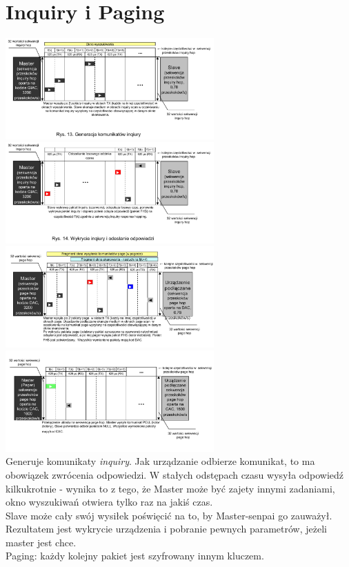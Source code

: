\section{Inquiry i Paging}
\includegraphics[width=8cm]{./wyklady/Rysunek06.pdf}
\includegraphics[width=8cm]{./wyklady/Rysunek07.pdf}\\
\includegraphics[width=8cm]{./wyklady/Rysunek08.pdf}
\includegraphics[width=8cm]{./wyklady/Rysunek09.pdf}\\
Generuje komunikaty \emph{inquiry}.
Jak urządzanie odbierze komunikat, to ma obowiązek zwrócenia odpowiedzi. W stałych odstępach czasu wysyła odpowiedź kilkukrotnie - wynika to z tego, że Master może być zajety innymi zadaniami, okno wyszukiwań otwiera tylko raz na jakiś czas.\\
Slave może cały swój wysiłek poświęcić na to, by Master-senpai go zauważył. \\

Rezultatem jest wykrycie urządzenia i pobranie pewnych parametrów, jeżeli master jest chce.\\

Paging: każdy kolejny pakiet jest szyfrowany innym kluczem.